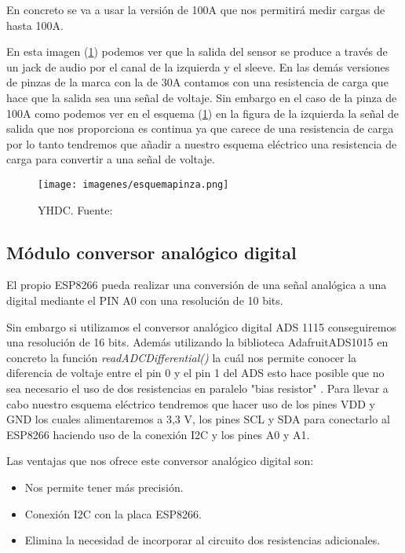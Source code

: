 En concreto se va a usar la versión de 100A que nos permitirá medir cargas de hasta 100A.

En esta imagen (\ref{fig:pinza}) podemos ver que la salida del sensor se produce a través de un jack de audio por el canal de la izquierda y el sleeve. En las demás versiones de pinzas de la marca con la de 30A contamos con una resistencia de carga que hace que la salida sea una señal de voltaje. Sin embargo en el caso de la pinza de 100A como podemos ver en el esquema (\ref{fig:pinza}) en la figura de la izquierda la señal de salida que nos proporciona es continua ya que carece de una resistencia de carga por lo tanto tendremos que añadir a nuestro esquema eléctrico una resistencia de carga para convertir a una señal de voltaje.  

\begin{figure}[H]
	\centering
	\texttt{[image: imagenes/esquemapinza.png]}
	\caption[YHDC.]{YHDC. Fuente: \cite{sensorcorriente}}
	\label{fig:pinza}
\end{figure}

\subsection{Módulo conversor analógico digital}
El propio ESP8266 pueda realizar una conversión de una señal analógica a una digital mediante el PIN A0 con una resolución de 10 bits.

Sin embargo si utilizamos el conversor analógico digital ADS 1115 conseguiremos una resolución de 16 bits. Además utilizando la biblioteca Adafruit\textunderscore ADS1015 \cite{adafruitbib} en concreto la función \textit{readADC\textunderscore Differential()} la cuál nos permite conocer la diferencia de voltaje entre el pin 0 y el pin 1 del ADS esto hace posible que no sea necesario el uso de dos resistencias en paralelo "bias resistor" . Para llevar a cabo nuestro esquema eléctrico tendremos que hacer uso de los pines VDD y GND los cuales alimentaremos a 3,3 V, los pines SCL y SDA para conectarlo al ESP8266 haciendo uso de la conexión I2C y los pines A0 y A1.

Las ventajas que nos ofrece este conversor analógico digital son:

\begin{itemize}
	\item Nos permite tener más precisión.
	\item Conexión I2C con la placa ESP8266.
	\item Elimina la necesidad de incorporar al circuito dos resistencias adicionales.
\end{itemize}


